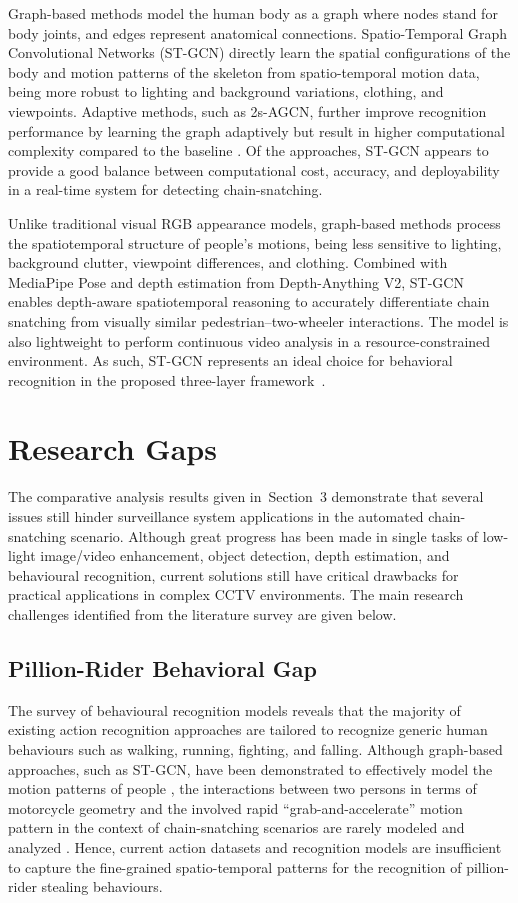 \documentclass[conference]{IEEEtran}
\begin{document}
Graph-based methods model the human body as a graph where nodes stand for body joints, and edges represent anatomical connections. Spatio-Temporal Graph Convolutional Networks (ST-GCN) directly learn the spatial configurations of the body and motion patterns of the skeleton from spatio-temporal motion data, being more robust to lighting and background variations, clothing, and viewpoints. Adaptive methods, such as 2s-AGCN, further improve recognition performance by learning the graph adaptively but result in higher computational complexity compared to the baseline \cite{shi2019twostreamagcn}. Of the approaches, ST-GCN appears to provide a good balance between computational cost, accuracy, and deployability in a real-time system for detecting chain-snatching.

Unlike traditional visual RGB appearance models, graph-based methods process the spatiotemporal structure of people’s motions, being less sensitive to lighting, background clutter, viewpoint differences, and clothing. Combined with MediaPipe Pose and depth estimation from Depth-Anything V2, ST-GCN enables depth-aware spatiotemporal reasoning to accurately differentiate chain snatching from visually similar pedestrian–two-wheeler interactions. The model is also lightweight to perform continuous video analysis in a resource-constrained environment. As such, ST-GCN represents an ideal choice for behavioral recognition in the proposed three-layer framework~\cite{yan2018stgcn}.

\section{Research Gaps}
\label{sec:gaps}

The comparative analysis results given in~Section~3 demonstrate that several issues still hinder surveillance system applications in the automated chain-snatching scenario. Although great progress has been made in single tasks of low-light image/video enhancement, object detection, depth estimation, and behavioural recognition, current solutions still have critical drawbacks for practical applications in complex CCTV environments. The main research challenges identified from the literature survey are given below.
\subsection{Pillion-Rider Behavioral Gap}

The survey of behavioural recognition models reveals that the majority of existing action recognition approaches are tailored to recognize generic human behaviours such as walking, running, fighting, and falling. Although graph-based approaches, such as ST-GCN, have been demonstrated to effectively model the motion patterns of people \cite{yan2018stgcn}, the interactions between two persons in terms of motorcycle geometry and the involved rapid ``grab-and-accelerate'' motion pattern in the context of chain-snatching scenarios are rarely modeled and analyzed \cite{roy2018snatch}. Hence, current action datasets and recognition models are insufficient to capture the fine-grained spatio-temporal patterns for the recognition of pillion-rider stealing behaviours.
\end{document}
